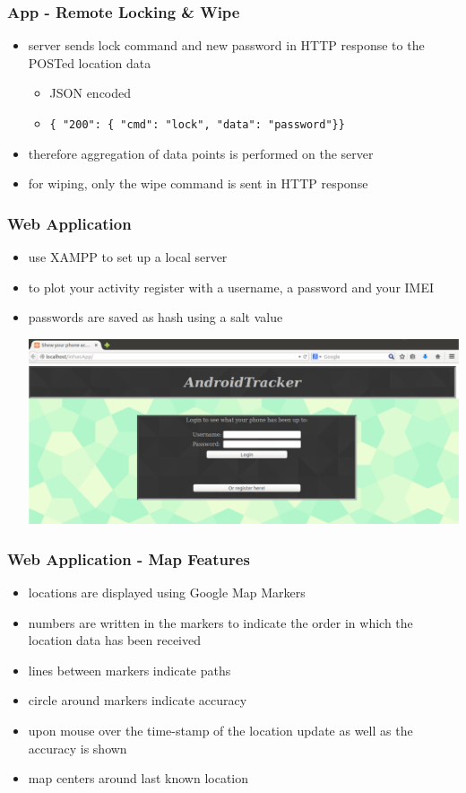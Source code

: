 \documentclass[darktitle]{beamer}
\begin{document}
	\begin{frame}
		\frametitle{App -  Remote Locking \& Wipe}
		\begin{itemize}
			\item server sends lock command and new password in HTTP response to the POSTed location data
			\begin{itemize}
				\item JSON encoded
				\item \texttt{\{ "200": \{ "cmd": "lock", "data": "password"\}\}}
			\end{itemize}
			\item therefore aggregation of data points is performed on the server
			\item for wiping, only the wipe command is sent in HTTP response
		\end{itemize}
	\end{frame}

	\begin{frame}
		\frametitle{Web Application}
		\begin{itemize}
			\item use XAMPP to set up a local server
			\item to plot your activity register with a username, a password and your IMEI
			\item passwords are saved as hash using a salt value
			\begin{center}
				\includegraphics[height=0.4\textheight]{figures/webApp_loginScreen.pdf}
			\end{center}
		\end{itemize}
	\end{frame}

	\begin{frame}
		\frametitle{Web Application - Map Features}
		\begin{itemize}
			\item locations are displayed using Google Map Markers
			\item numbers are written in the markers to indicate the order in which the location data has been received
			\item lines between markers indicate paths
			\item circle around markers indicate accuracy
			\item upon mouse over the time-stamp of the location update as well as the accuracy is shown
			\item map centers around last known location
		\end{itemize}
	\end{frame}
\end{document}
